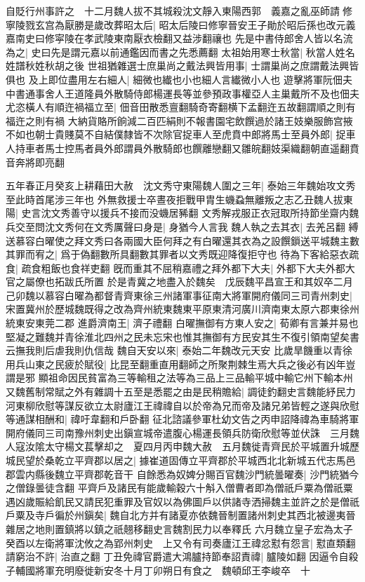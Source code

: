 自貶行州事許之　十二月魏人拔不其城殺沈文靜入東陽西郭　義嘉之亂巫師請修寧陵戮玄宫為厭勝是歲改葬昭太后|{
	昭太后陵曰修寧晉安王子勛於昭后孫也改元義嘉南史曰修寜陵在孝武陵東南厭衣檢翻又益涉翻禳也}
先是中書侍郎舍人皆以名流為之|{
	史曰先是謂元嘉以前通鑑因而書之先悉薦翻}
太祖始用寒士秋當|{
	秋當人姓名姓譜秋姓秋胡之後}
世祖猶雜選士庶巢尚之戴法興皆用事|{
	士謂巢尚之庶謂戴法興皆俱也}
及上即位盡用左右細人|{
	細微也纎也小也細人言纎微小人也}
遊擊將軍阮佃夫中書通事舍人王道隆員外散騎侍郎楊運長等並參預政事權亞人主巢戴所不及也佃夫尤恣橫人有順迕禍福立至|{
	佃音田散悉亶翻騎奇寄翻横下孟翻迕五故翻謂順之則有福迕之則有禍}
大納貨賂所餉減二百匹絹則不報書園宅飲饌過於諸王妓樂服飾宫掖不如也朝士貴賤莫不自結僕隸皆不次除官捉車人至虎賁中郎將馬士至員外郎|{
	捉車人持車者馬士控馬者員外郎謂員外散騎郎也饌離戀翻又雛皖翻妓渠織翻朝直遥翻賁音奔將即亮翻}


五年春正月癸亥上耕藉田大赦　沈文秀守東陽魏人圍之三年|{
	泰始三年魏始攻文秀至此時首尾涉三年也}
外無救援士卒晝夜拒戰甲胄生蟣蝨無離叛之志乙丑魏人拔東陽|{
	史言沈文秀善守以援兵不接而没蟣居豨翻}
文秀解戎服正衣冠取所持節坐齋内魏兵交至問沈文秀何在文秀厲聲曰身是|{
	身猶今人言我}
魏人執之去其衣|{
	去羌呂翻}
縛送慕容白曜使之拜文秀曰各兩國大臣何拜之有白曜還其衣為之設饌鎻送平城魏主數其罪而宥之|{
	爲于偽翻數所具翻數其罪者以文秀既迎降復拒守也}
待為下客給惡衣疏食|{
	疏食粗飯也食祥吏翻}
旣而重其不屈稍嘉禮之拜外都下大夫|{
	外都下大夫外都大官之屬僚也拓跋氏所置}
於是青冀之地盡入於魏矣　戊辰魏平昌宣王和其奴卒二月己卯魏以慕容白曜為都督青齊東徐三州諸軍事征南大將軍開府儀同三司青州刺史|{
	宋置冀州於歷城魏既得之改為齊州統東魏東平原東清河廣川濟南東太原六郡東徐州統東安東莞二郡}
進爵濟南王|{
	濟子禮翻}
白曜撫御有方東人安之|{
	荀卿有言兼并易也堅凝之難魏并青徐淮北四州之民未忘宋也惟其撫御有方民安其生不復引領南望矣書云撫我則后虐我則仇信哉}
魏自天安以來|{
	泰始二年魏改元天安}
比歲旱饑重以青徐用兵山東之民疲於賦役|{
	比昆至翻重直用翻師之所聚荆棘生焉大兵之後必有凶年豈謂是邪}
顯祖命因民貧富為三等輸租之法等為三品上三品輸平城中輸它州下輸本州又魏舊制常賦之外有雜調十五至是悉罷之由是民稍贍給|{
	調徒釣翻史言魏能紓民力}
河東柳欣慰等謀反欲立太尉廬江王禕禕自以於帝為兄而帝及諸兄弟皆輕之遂與欣慰等通謀相酬和|{
	禕吁韋翻和戶卧翻}
征北諮議參軍杜幼文告之丙申詔降禕為車騎將軍開府儀同三司南豫州刺史出鎭宣城帝遣腹心楊運長領兵防衛欣慰等並伏誅　三月魏人寇汝隂太守楊文萇擊却之　夏四月丙申魏大赦　五月魏徙青齊民於平城置升城歷城民望於桑乾立平齊郡以居之|{
	據崔道固傳立平齊郡於平城西北北新城五代志馬邑郡雲内縣後魏立平齊郡乾音干}
自餘悉為奴婢分賜百官魏沙門統曇曜奏|{
	沙門統猶今之僧錄曇徒含翻}
平齊戶及諸民有能歲輸穀六十斛入僧曹者即為僧祇戶粟為僧祇粟遇凶歲賑給飢民又請民犯重罪及官奴以為佛圖戶以供諸寺洒掃魏主並許之於是僧祇戶粟及寺戶徧於州鎭矣|{
	魏自北方并有諸夏亦依魏晉制置諸州刺史其西北被邊夷晉雜居之地則置鎮將以鎮之祇翹移翻史言魏割民力以奉釋氏}
六月魏立皇子宏為太子　癸酉以左衛將軍沈攸之為郢州刺史　上又令有司奏廬江王禕忿懟有怨言|{
	懟直類翻}
請窮治不許|{
	治直之翻}
丁丑免禕官爵遣大鴻臚持節奉詔責禕|{
	臚陵如翻}
因逼令自殺子輔國將軍充明廢徙新安冬十月丁卯朔日有食之　魏頓邱王李峻卒　十

